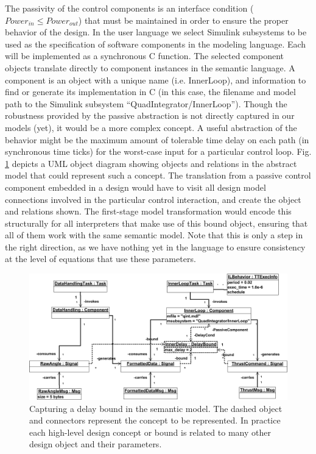 The passivity of the control components is an interface condition ($Power_{in} \leq Power_{out}$) that 
must be maintained in order to ensure the proper behavior of the design.  In the user language we select 
Simulink subsystems to be used as the specification of software components in the modeling language. Each 
will be implemented as a synchronous C function.  The selected component objects translate directly to 
component instances in the semantic language.  A component is an object with a unique name (i.e. InnerLoop), 
and information to find or generate its implementation in C (in this case, the filename and model path to 
the Simulink subsystem "`QuadIntegrator/InnerLoop"'). Though the robustness provided by the passive abstraction 
is not directly captured in our models (yet), it would be a more complex concept.  A useful abstraction of the 
behavior might be the maximum amount of tolerable time delay on each path (in synchronous time ticks) for the 
worst-case input for a particular control loop. Fig. \ref{fig:delay_abs} depicts a UML object diagram showing 
objects and relations in the abstract model that could represent such a concept.  The translation from a 
passive control component embedded in a design would have to visit all design model connections involved in the 
particular control interaction, and create the object and relations shown.  The first-stage model transformation 
would encode this structurally for all interpreters that make use of this bound object, ensuring that 
all of them work with the same semantic model.  Note that this is only a step in the right direction, as we 
have nothing yet in the language to ensure consistency at the level of equations that use these parameters.

\begin{figure}
\centering
\includegraphics[width=\columnwidth]{figures/delay_bound.png}
    \caption{Capturing a delay bound in the semantic model.  The dashed object and connectors represent the 
concept to be represented. In practice each high-level design concept or bound is related to many other 
design object and their parameters.}
    \label{fig:delay_abs}
\end{figure}
